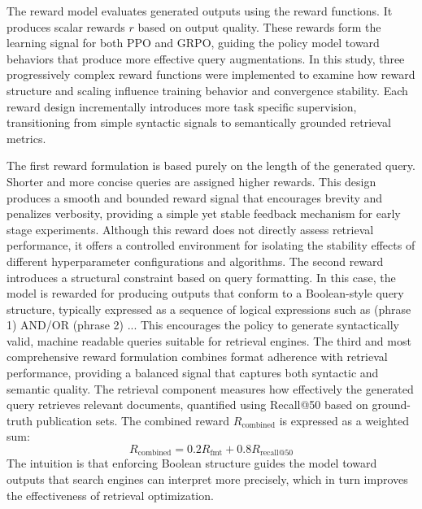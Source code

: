 The reward model evaluates generated outputs using the reward functions. It produces scalar rewards $r$ based on output quality. These rewards form the learning signal for both PPO and GRPO, guiding the policy model toward behaviors that produce more effective query augmentations. In this study, three progressively complex reward functions were implemented to examine how reward structure and scaling influence training behavior and convergence stability. Each reward design incrementally introduces more task specific supervision, transitioning from simple syntactic signals to semantically grounded retrieval metrics. 

The first reward formulation is based purely on the length of the generated query. Shorter and more concise queries are assigned higher rewards. This design produces a smooth and bounded reward signal that encourages brevity and penalizes verbosity, providing a simple yet stable feedback mechanism for early stage experiments. Although this reward does not directly assess retrieval performance, it offers a controlled environment for isolating the stability effects of different hyperparameter configurations and algorithms. The second reward introduces a structural constraint based on query formatting. In this case, the model is rewarded for producing outputs that conform to a Boolean-style query structure, typically expressed as a sequence of logical expressions such as (phrase 1) AND/OR (phrase 2) ... This encourages the policy to generate syntactically valid, machine readable queries suitable for retrieval engines. The third and most comprehensive reward formulation combines format adherence with retrieval performance, providing a balanced signal that captures both syntactic and semantic quality. The retrieval component measures how effectively the generated query retrieves relevant documents, quantified using Recall@50 based on ground-truth publication sets. The combined reward $R_{\text{combined}}$ is expressed as a weighted sum:
$$ R_{\text{combined}} = 0.2 R_{\text{fmt}} + 0.8 R_{\text{recall}@50} $$
The intuition is that enforcing Boolean structure guides the model toward outputs that search engines can interpret more precisely, which in turn improves the effectiveness of retrieval optimization.

